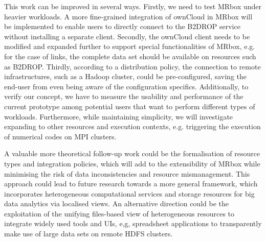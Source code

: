 This work can be improved in several ways. Firstly, we need to test MRbox under heavier workloads. A more fine-grained integration of ownCloud in MRbox will be implemented to enable users to directly connect to the B2DROP service without installing a separate client. Secondly, the ownCloud client needs to be modified and expanded further to support special functionalities of MRbox, e.g. for the case of links, the complete data set should be available on resources such as B2DROP. Thirdly, according to a distribution policy, the connection to remote infrastructures, such as a Hadoop cluster, could be pre-configured, saving the end-user from even being aware of the configuration specifics. Additionally, to verify our concept, we have to measure the usability and performance of the current prototype among potential users that want to perform different types of workloads. Furthermore, while maintaining simplicity, we will investigate expanding to other resources and execution contexts, e.g. triggering the execution of numerical codes on MPI clusters. 

A valuable more theoretical follow-up work could be the formalisation of resource types and integration policies, which will add to the extensibility of MRbox while minimising the risk of data inconsistencies and resource mismanagement. This approach could lead to future research towards a more general framework, which incorporates heterogeneous computational services and storage resources for big data analytics via localised views. An alternative direction could be the exploitation of the unifying files-based view of heterogeneous resources to integrate widely used tools and UIs, e,g, spreadsheet applications to transparently make use of large data sets on remote HDFS clusters.

